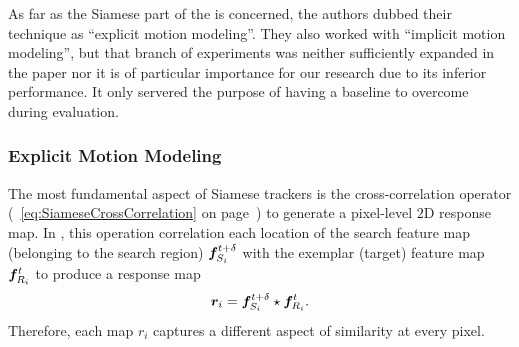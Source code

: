 As far as the Siamese part of the \siammot{} is concerned, the authors dubbed their technique as ``explicit motion modeling''. They also worked with ``implicit motion modeling'', but that branch of experiments was neither sufficiently expanded in the paper nor it is of particular importance for our research due to its inferior performance. It only servered the purpose of having a baseline to overcome during evaluation.

\subsubsection{Explicit Motion Modeling}

The most fundamental aspect of Siamese trackers is the cross-correlation operator (\sectiontext{}~\ref{eq:SiameseCrossCorrelation} on page~\pageref{eq:SiameseCrossCorrelation}) to generate a pixel-level $2$D response map. In \siammot{}, this operation correlation each location of the search feature map (belonging to the search region) $\bm{f}_{S_i}^{t + \delta}$ with the exemplar (target) feature map $\bm{f}_{R_i}^{t}$ to produce a response map
\begin{equation}
    \bm{r}_{i} = \bm{f}_{S_i}^{t + \delta} \star \bm{f}_{R_i}^{t}.
\end{equation}
Therefore, each map $r_i$ captures a different aspect of similarity at every pixel.

